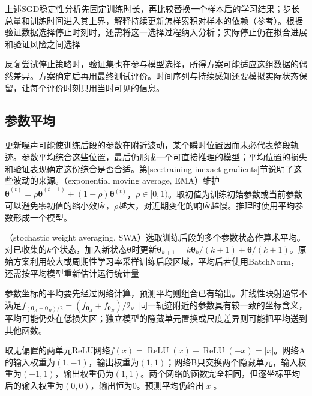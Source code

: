 上述SGD稳定性分析先固定训练时长，再比较替换一个样本后的学习结果；步长总量和训练时间进入其上界，解释持续更新怎样累积对样本的依赖（参考）。根据验证数据选择停止时刻时，还需将这一选择过程纳入分析；实际停止仍在拟合进展和验证风险之间选择

反复尝试停止策略时，验证集也在参与模型选择，所得方案可能适应这组数据的偶然差异。方案确定后再用最终测试评价。时间序列与持续感知还要模拟实际状态保留，让每个评价时刻只用当时可见的信息。

\subsection{参数平均}
\label{sec:generalization-weight-averaging}

更新噪声可能使训练后段的参数在附近波动，某个瞬时位置因而未必代表整段轨迹。参数平均综合这些位置，最后仍形成一个可直接推理的模型；平均位置的损失和验证表现确定这份综合是否合适。第\ref{sec:training-inexact-gradients}节说明了这些波动的来源。（exponential moving average, EMA）维护$\bar{\bm\theta}^{(t)}=\rho\bar{\bm\theta}^{(t-1)}+(1-\rho)\bm\theta^{(t)}$，$\rho\in[0,1)$。取初值为训练初始参数或当前参数可以避免零初值的缩小效应，$\rho$越大，对近期变化的响应越慢。推理时使用平均参数形成一个模型。

（stochastic weight averaging, SWA）选取训练后段的多个参数状态作算术平均。对已收集的$k$个状态，加入新状态$\bm\theta$时更新$\bar{\bm\theta}_{k+1}=k\bar{\bm\theta}_k/(k+1)+\bm\theta/(k+1)$。原始方案利用较大或周期性学习率采样训练后段区域，平均后若使用BatchNorm，还需按平均模型重新估计运行统计量

参数坐标的平均要先经过网络计算，预测平均则组合已有输出。非线性映射通常不满足$f_{(\bm\theta_A+\bm\theta_B)/2}=(f_{\bm\theta_A}+f_{\bm\theta_B})/2$。同一轨迹附近的参数具有较一致的坐标含义，平均可能仍处在低损失区；独立模型的隐藏单元置换或尺度差异则可能把平均送到其他函数。

\begin{example}[等价网络的参数平均可以失效]
  \label{ex:generalization-parameter-average}
  取无偏置的两单元ReLU网络$f(x)=\operatorname{ReLU}(x)+\operatorname{ReLU}(-x)=|x|$。网络A的输入权重为$(1,-1)$，输出权重为$(1,1)$；网络B只交换两个隐藏单元，输入权重为$(-1,1)$，输出权重仍为$(1,1)$。两个网络的函数完全相同，但逐坐标平均后的输入权重为$(0,0)$，输出恒为0。预测平均仍给出$|x|$。
\end{example}


